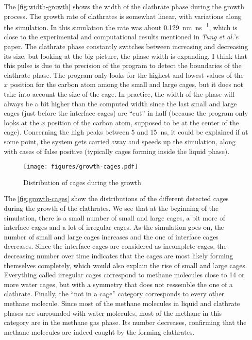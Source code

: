 The \autoref{fig:width-growth} shows the width of the clathrate phase during the growth process.
The growth rate of clathrates is somewhat linear, with variations along the simulation. In this simulation the rate was about \SI{0.129}{\nano\meter\per\nano\second}, which is close to the experimental and computational results mentioned in \textit{Tung et al.}'s paper. The clathrate phase constantly switches between increasing and decreasing its size, but looking at the big picture, the phase width is expanding. I think that this pulse is due to the precision of the program to detect the boundaries of the clathrate phase. The program only looks for the highest and lowest values of the $x$ position for the carbon atom among the small and large cages, but it does not take into account the size of the cage. In practice, the width of the phase will always be a bit higher than the computed width since the last small and large cages (just before the interface cages) are ``cut'' in half (because the program only looks at the $x$ position of the carbon atom, supposed to be at the center of the cage). Concerning the high peaks between 5 and \SI{15}{\nano\second}, it could be explained if at some point, the system gets carried away and speeds up the simulation, along with cases of false positive (typically cages forming inside the liquid phase).

\begin{figure}[htbp]
    \centering
    \texttt{[image: figures/growth-cages.pdf]}
    \caption{Distribution of cages during the growth} \label{fig:growth-cages}
\end{figure}

The \autoref{fig:growth-cages} show the distributions of the different detected cages during the growth of the clathrates. We see that at the beginning of the simulation, there is a small number of small and large cages, a bit more of interface cages and a lot of irregular cages. As the simulation goes on, the number of small and large cages increases and the one of interface cages decreases. Since the interface cages are considered as incomplete cages, the decreasing number over time indicates that the cages are most likely forming themselves completely, which would also explain the rise of small and large cages. Everything called irregular cages correspond to methane molecules close to 14 or more water cages, but with a symmetry that does not ressemble the one of a clathrate. Finally, the ``not in a cage'' category corresponds to every other methane molecule. Since most of the methane molecules in liquid and clathrate phases are surrounded with water molecules, most of the methane in this category are in the methane gas phase. Its number decreases, confirming that the methane molecules are indeed caught by the forming clathrates. 

